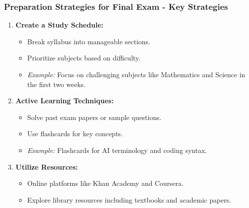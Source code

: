 \documentclass{beamer}
\begin{document}
\begin{frame}[fragile]
    \frametitle{Preparation Strategies for Final Exam - Key Strategies}
    \begin{enumerate}
        \item \textbf{Create a Study Schedule:}
        \begin{itemize}
            \item Break syllabus into manageable sections.
            \item Prioritize subjects based on difficulty.
            \item \textit{Example:} Focus on challenging subjects like Mathematics and Science in the first two weeks.
        \end{itemize}

        \item \textbf{Active Learning Techniques:}
        \begin{itemize}
            \item Solve past exam papers or sample questions.
            \item Use flashcards for key concepts.
            \item \textit{Example:} Flashcards for AI terminology and coding syntax.
        \end{itemize}

        \item \textbf{Utilize Resources:}
        \begin{itemize}
            \item Online platforms like Khan Academy and Coursera.
            \item Explore library resources including textbooks and academic papers.
        \end{itemize}
    \end{enumerate}
\end{frame}
\end{document}

